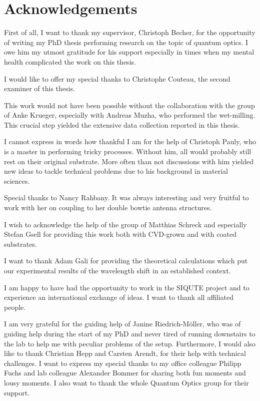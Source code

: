 

\null\vfill
\section*{Acknowledgements}
	
	First of all, I want to thank my supervisor, Christoph Becher, for the opportunity of writing my PhD thesis performing research on the topic of quantum optics. 
	I owe him my utmost gratitude for his support especially in times when my mental health complicated the work on this thesis.

	I would like to offer my special thanks to Christophe Couteau, the second examiner of this thesis. 

	This work would not have been possible without the collaboration with the group of Anke Krueger, especially with Andreas Muzha, who performed the wet-milling. 
	This crucial step yielded the extensive data collection reported in this thesis.

	I cannot express in words how thankful I am for the help of Christoph Pauly, who is a master in performing tricky \pp processes. Without him, all \nds would probably still rest on their original substrate. 
	More often than not discussions with him yielded new ideas to tackle technical problems due to his background in material sciences.

	Special thanks to Nancy Rahbany. It was always interesting and very fruitful to work with her on coupling \nds to her double bowtie antenna structures. 

	I wish to acknowledge the help of the group of Matthias Schreck and especially Stefan Gsell for providing this work both with CVD-grown \nds and with \ir coated substrates.

	I want to thank Adam Gali for providing the theoretical calculations which put our experimental results of the wavelength shift in an established context.

	I am happy to have had the opportunity to work in the SIQUTE project and to experience an international exchange of ideas. I want to thank all affiliated people.

	I am very grateful for the guiding help of Janine Riedrich-Möller, who was of guiding help during the start of my PhD and never tired of running downstairs to the lab to help me with peculiar problems of the setup. 
	Furthermore, I would also like to thank Christian Hepp and Carsten Arendt, for their help with technical challenges. 
	I want to express my special thanks to my office colleague Philipp Fuchs and lab colleague Alexander Bommer for sharing both fun moments and lousy moments.
	I also want to thank the whole Quantum Optics group for their support.

